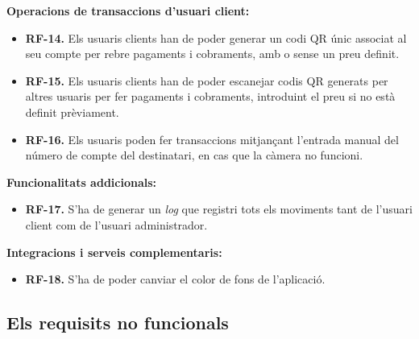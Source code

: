 \documentclass[a4paper,12pt,twoside]{ThesisStyle}
\begin{document}
\textbf{Operacions de transaccions d'usuari client:}
\begin{itemize}
    \item \textbf{RF-14.} Els usuaris clients han de poder generar un codi QR únic associat al seu compte per rebre pagaments i cobraments, amb o sense un preu definit.
    \item \textbf{RF-15.} Els usuaris clients han de poder escanejar codis QR generats per altres usuaris per fer pagaments i cobraments, introduint el preu si no està definit prèviament.
    \item \textbf{RF-16.} Els usuaris poden fer transaccions mitjançant l'entrada manual del número de compte del destinatari, en cas que la càmera no funcioni.

\end{itemize}

\textbf{Funcionalitats addicionals:}
\begin{itemize}
    \item \textbf{RF-17.} S'ha de generar un \textit{log} que registri tots els moviments tant de l'usuari client com de l'usuari administrador.
\end{itemize}


\textbf{Integracions i serveis complementaris:}
\begin{itemize}
        \item \textbf{RF-18.} S'ha de poder canviar el color de fons de l'aplicació.
\end{itemize}


\subsection{Els requisits no funcionals}
\label{subsec:Els requisits no funcionals }
\end{document}
